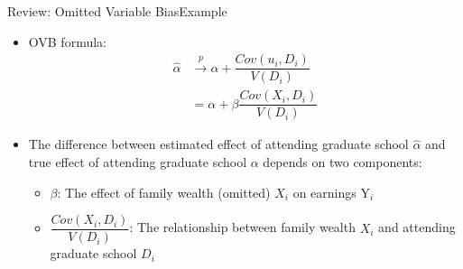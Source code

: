 \documentclass[dvipsnames,hyperref={pdfpagelabels=false}]{beamer}
\begin{document}
\begin{frame}{Review: Omitted Variable Bias}{Example}

\begin{itemize}


\item OVB formula: 
\begin{equation*}
	\begin{aligned}
   \hat{\alpha} &\overset{p}{\rightarrow} \alpha + \dfrac{Cov(u_{i},D_{i})}{V(D_{i})}  \\	
       &= \alpha + \beta \dfrac{Cov(X_{i},D_{i})}{V(D_{i})}
   	\end{aligned}	
	\end{equation*}
\item The difference between estimated effect of attending graduate school $\hat{\alpha}$ and true effect of attending graduate school $\alpha$ depends on two components:
\vspace{0.3cm}
\begin{itemize}
\item[1] $\beta$: The effect of family wealth (omitted) $X_{i}$ on earnings $\mathrm{Y}_{i}$ 
\vspace{0.3cm}
\item[2] $\dfrac{Cov(X_{i},D_{i})}{V(D_{i})}$: The relationship between family wealth $X_{i}$ and attending graduate school $D_{i}$ 


\end{itemize}
	
\end{itemize}

\end{frame}
\end{document}
